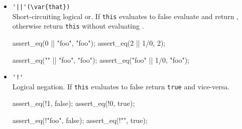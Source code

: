 \begin{itemize}

\item \lstinline/'||'(\var{that})/\\
  Short-circuiting logical or. If \lstinline|this| evaluates to false
  evaluate and return , otherwise return \lstinline|this|
  without evaluating .
\begin{urbiscript}[firstnumber=last]
assert_eq(0 || "foo", "foo");
assert_eq(2 ||  1/0,  2);

assert_eq(""    || "foo", "foo");
assert_eq("foo" || 1/0,   "foo");
\end{urbiscript}

\item \lstinline|'!'|\\
  Logical negation. If \lstinline|this| evaluates to false return
  \lstinline|true| and vice-versa.
\begin{urbiscript}[firstnumber=last]
assert_eq(!1, false);
assert_eq(!0, true);

assert_eq(!"foo", false);
assert_eq(!"",    true);
\end{urbiscript}
\end{itemize}

